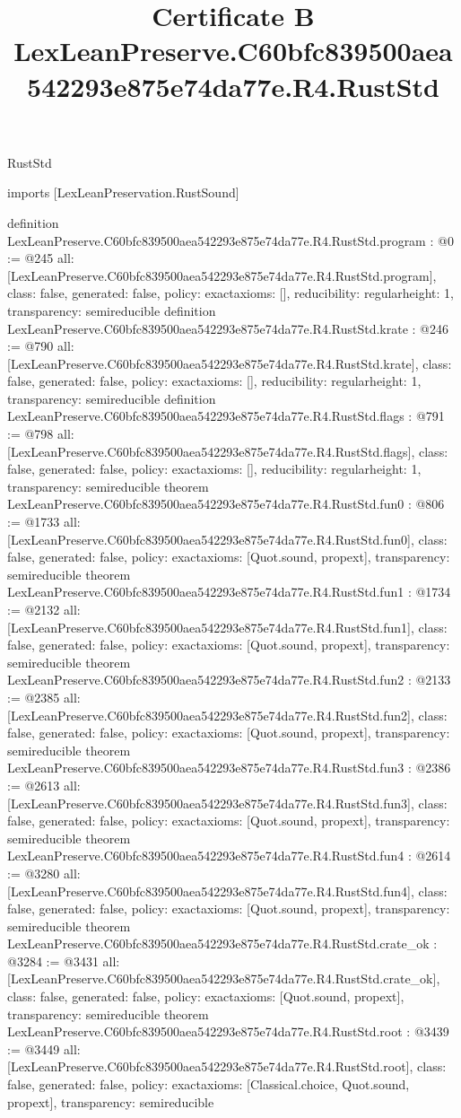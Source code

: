\begin{lexlean}{RustStd}
\title{Certificate B LexLeanPreserve.C60bfc839500aea542293e875e74da77e.R4.RustStd}
\begin{coremodule}
imports [LexLeanPreservation.RustSound]

definition LexLeanPreserve.C60bfc839500aea542293e875e74da77e.R4.RustStd.program : @0 := @245 {
  all: [LexLeanPreserve.C60bfc839500aea542293e875e74da77e.R4.RustStd.program],
  class: false,
  generated: false,
  policy: exact{axioms: []},
  reducibility: regular{height: 1},
  transparency: semireducible
}
definition LexLeanPreserve.C60bfc839500aea542293e875e74da77e.R4.RustStd.krate : @246 := @790 {
  all: [LexLeanPreserve.C60bfc839500aea542293e875e74da77e.R4.RustStd.krate],
  class: false,
  generated: false,
  policy: exact{axioms: []},
  reducibility: regular{height: 1},
  transparency: semireducible
}
definition LexLeanPreserve.C60bfc839500aea542293e875e74da77e.R4.RustStd.flags : @791 := @798 {
  all: [LexLeanPreserve.C60bfc839500aea542293e875e74da77e.R4.RustStd.flags],
  class: false,
  generated: false,
  policy: exact{axioms: []},
  reducibility: regular{height: 1},
  transparency: semireducible
}
theorem LexLeanPreserve.C60bfc839500aea542293e875e74da77e.R4.RustStd.fun0 : @806 := @1733 {
  all: [LexLeanPreserve.C60bfc839500aea542293e875e74da77e.R4.RustStd.fun0],
  class: false,
  generated: false,
  policy: exact{axioms: [Quot.sound, propext]},
  transparency: semireducible
}
theorem LexLeanPreserve.C60bfc839500aea542293e875e74da77e.R4.RustStd.fun1 : @1734 := @2132 {
  all: [LexLeanPreserve.C60bfc839500aea542293e875e74da77e.R4.RustStd.fun1],
  class: false,
  generated: false,
  policy: exact{axioms: [Quot.sound, propext]},
  transparency: semireducible
}
theorem LexLeanPreserve.C60bfc839500aea542293e875e74da77e.R4.RustStd.fun2 : @2133 := @2385 {
  all: [LexLeanPreserve.C60bfc839500aea542293e875e74da77e.R4.RustStd.fun2],
  class: false,
  generated: false,
  policy: exact{axioms: [Quot.sound, propext]},
  transparency: semireducible
}
theorem LexLeanPreserve.C60bfc839500aea542293e875e74da77e.R4.RustStd.fun3 : @2386 := @2613 {
  all: [LexLeanPreserve.C60bfc839500aea542293e875e74da77e.R4.RustStd.fun3],
  class: false,
  generated: false,
  policy: exact{axioms: [Quot.sound, propext]},
  transparency: semireducible
}
theorem LexLeanPreserve.C60bfc839500aea542293e875e74da77e.R4.RustStd.fun4 : @2614 := @3280 {
  all: [LexLeanPreserve.C60bfc839500aea542293e875e74da77e.R4.RustStd.fun4],
  class: false,
  generated: false,
  policy: exact{axioms: [Quot.sound, propext]},
  transparency: semireducible
}
theorem LexLeanPreserve.C60bfc839500aea542293e875e74da77e.R4.RustStd.crate_ok : @3284 := @3431 {
  all: [LexLeanPreserve.C60bfc839500aea542293e875e74da77e.R4.RustStd.crate_ok],
  class: false,
  generated: false,
  policy: exact{axioms: [Quot.sound, propext]},
  transparency: semireducible
}
theorem LexLeanPreserve.C60bfc839500aea542293e875e74da77e.R4.RustStd.root : @3439 := @3449 {
  all: [LexLeanPreserve.C60bfc839500aea542293e875e74da77e.R4.RustStd.root],
  class: false,
  generated: false,
  policy: exact{axioms: [Classical.choice, Quot.sound, propext]},
  transparency: semireducible
}


\end{coremodule}
\end{lexlean}
